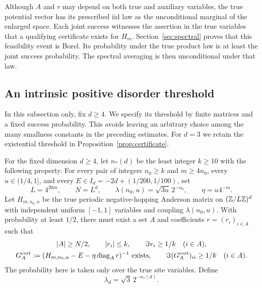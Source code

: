 Although $A$ and $r$ may depend on both true and auxiliary variables, the
true potential vector has its prescribed iid law as the unconditional
marginal of the enlarged space. Each joint success witnesses the assertion
in the true variables that a qualifying certificate exists for $H_m$.
Section~\ref{sec:spectral} proves that this feasibility event is Borel.
Its probability under the true product law is at least the joint success
probability. The spectral averaging is then unconditional under that law.

\subsection{An intrinsic positive disorder threshold}

In this subsection only, fix $d\ge4$. We specify its threshold by
finite matrices and a fixed success probability. This avoids leaving
an arbitrary choice among the many smallness constants in the
preceding estimates. For $d=3$ we retain the existential threshold
in Proposition~\ref{prop:certificate}.

\begin{definition}
\label{def:threshold}
For the fixed dimension $d\ge4$, let $n_*(d)$ be the least integer
$k\ge10$ with the following property. For every pair of integers
$n_0\ge k$ and $m\ge4n_0$, every $u\in(1/4,1]$, and every
$E\in I_d=-2d+(1/200,1/100)$, set
\[
 L=4^{20m},\qquad N=L^d,\qquad
 \lambda(n_0,u)=\sqrt{3u}\,2^{-n_0},\qquad \eta=u4^{-m}.
\]
Let $H_{m,n_0,u}$ be the true periodic negative-hopping Anderson matrix
on $(\mathbb Z/L\mathbb Z)^d$ with independent uniform $[-1,1]$ variables and
coupling $\lambda(n_0,u)$. With probability at least $1/2$, there must
exist a set $A$ and coefficients $r=(r_i)_{i\in A}$ such that
\begin{equation}
 \begin{gathered}
 |A|\ge N/2,\qquad |r_i|\le k,\qquad \Im r_i\ge1/k\quad(i\in A),\\
 G_A^{\rm cert}:=
 (H_{m,n_0,u}-E-\eta\operatorname{diag}_A r)^{-1}\ \text{exists},\qquad
 \Im(G_A^{\rm cert})_{ii}\ge1/k\quad(i\in A).
 \end{gathered}
 \label{eq:threshold-criterion}
\end{equation}
The probability here is taken only over the true site variables.
Define
\begin{equation}
 \lambda_d=\sqrt3\,2^{-n_*(d)}.
 \label{eq:threshold-lambda}
\end{equation}
\end{definition}

